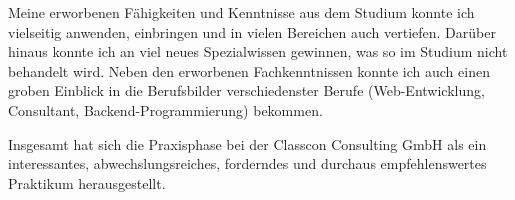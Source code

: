 \documentclass{whswinvcbook}
\begin{document}
Meine erworbenen Fähigkeiten und Kenntnisse aus dem Studium konnte ich vielseitig anwenden, einbringen und in vielen Bereichen auch vertiefen. Darüber hinaus konnte ich an viel neues Spezialwissen gewinnen, was so im Studium nicht behandelt wird. Neben den erworbenen Fachkenntnissen konnte ich auch einen groben Einblick in die Berufsbilder verschiedenster Berufe (Web-Entwicklung, Consultant, Backend-Programmierung) bekommen.

Insgesamt hat sich die Praxisphase bei der Classcon Consulting GmbH als ein interessantes, abwechslungsreiches, forderndes und durchaus empfehlenswertes Praktikum herausgestellt.

\cite{1}
\cite{2}
\cite{3}
\cite{4}
\cite{5}
\cite{6}
\cite{7}
\backmatter

\preparebibliography

\end{document}
